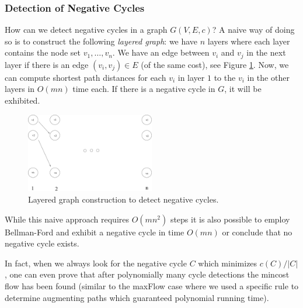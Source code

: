 \documentclass{article}
\begin{document}
\subsubsection*{Detection of Negative Cycles}
How can we detect negative cycles in a graph $G(V,E,c)$? A naive way of doing so is to construct the following \emph{layered graph}:
we have $n$ layers where each layer contains the node set $v_1, \dots, v_n$. We have an edge between $v_i$ and $v_j$ in the next
layer if there is an edge $(v_i, v_j)\in E$ (of the same cost), see Figure \ref{fig:negCycle}. Now, we can compute shortest path distances for each $v_i$ in layer $1$ to the $v_i$ in the other layers in $O(mn)$ time each. If there is a negative cycle in $G$, it will be exhibited.
\begin{figure}
\begin{center}
\includegraphics[width=0.5\textwidth]{Figs/negCycle.pdf}
\caption{Layered graph construction to detect negative cycles.}\label{fig:negCycle}
\end{center}
\end{figure}

While this naive approach requires $O(mn^2)$ steps it is also possible to employ Bellman-Ford and exhibit a negative cycle in time $O(mn)$ or conclude that no negative cycle exists.

In fact, when we always look for the negative cycle $C$ which minimizes $c(C)/|C|$, one can even prove that after polynomially many cycle detections the mincost flow has been found (similar to the maxFlow case where we used a specific rule to determine augmenting paths which guaranteed polynomial running time).
\end{document}
